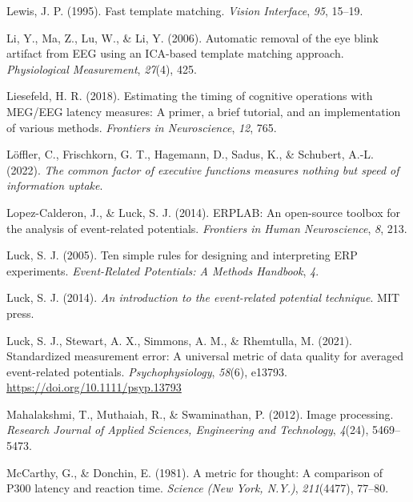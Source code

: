 \documentclass[
  man]{apa7}
\newlength{\cslhangindent}
\newlength{\cslentryspacingunit} %
\newenvironment{CSLReferences}[2] %
 {%
  \setlength{\parindent}{0pt}
  \ifodd #1
  \let\oldpar\par
  \def\par{\hangindent=\cslhangindent\oldpar}
  \fi
  \setlength{\parskip}{#2\cslentryspacingunit}
 }%
 {}
\begin{document}
\begin{CSLReferences}{1}{0}
\leavevmode{}%
Lewis, J. P. (1995). Fast template matching. \emph{Vision Interface}, \emph{95}, 15--19.

\leavevmode{}%
Li, Y., Ma, Z., Lu, W., \& Li, Y. (2006). Automatic removal of the eye blink artifact from {EEG} using an {ICA}-based template matching approach. \emph{Physiological Measurement}, \emph{27}(4), 425.

\leavevmode{}%
Liesefeld, H. R. (2018). Estimating the timing of cognitive operations with {MEG}/{EEG} latency measures: A primer, a brief tutorial, and an implementation of various methods. \emph{Frontiers in Neuroscience}, \emph{12}, 765.

\leavevmode{}%
Löffler, C., Frischkorn, G. T., Hagemann, D., Sadus, K., \& Schubert, A.-L. (2022). \emph{The common factor of executive functions measures nothing but speed of information uptake}.

\leavevmode{}%
Lopez-Calderon, J., \& Luck, S. J. (2014). {ERPLAB}: An open-source toolbox for the analysis of event-related potentials. \emph{Frontiers in Human Neuroscience}, \emph{8}, 213.

\leavevmode{}%
Luck, S. J. (2005). Ten simple rules for designing and interpreting {ERP} experiments. \emph{Event-Related Potentials: A Methods Handbook}, \emph{4}.

\leavevmode{}%
Luck, S. J. (2014). \emph{An introduction to the event-related potential technique}. MIT press.

\leavevmode{}%
Luck, S. J., Stewart, A. X., Simmons, A. M., \& Rhemtulla, M. (2021). Standardized measurement error: {A} universal metric of data quality for averaged event-related potentials. \emph{Psychophysiology}, \emph{58}(6), e13793. \url{https://doi.org/10.1111/psyp.13793}

\leavevmode{}%
Mahalakshmi, T., Muthaiah, R., \& Swaminathan, P. (2012). Image processing. \emph{Research Journal of Applied Sciences, Engineering and Technology}, \emph{4}(24), 5469--5473.

\leavevmode{}%
McCarthy, G., \& Donchin, E. (1981). A metric for thought: A comparison of {P300} latency and reaction time. \emph{Science (New York, N.Y.)}, \emph{211}(4477), 77--80.


\end{CSLReferences}
\end{document}
